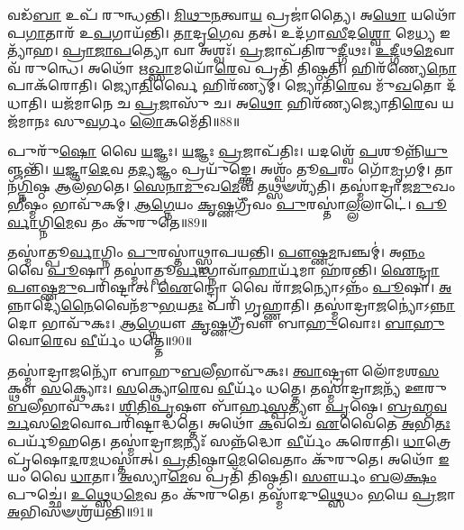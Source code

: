 𑌵𑌡᳴\-\ul{𑌬𑌾} 𑌉𑌪᳴ 𑌰𑍁𑌨𑍍𑌧𑌨𑍍𑌤𑌿।
\-\ul{𑌮𑌿}\-\-\ul{𑌥𑍁}\-\-\ul{𑌨}\-𑌤𑍍𑌵𑌾\-\ul{𑌯} 𑌪𑍍𑌰𑌜𑌾॑𑌤𑍍𑌯𑍈।
𑌅\-\ul{𑌥𑍋} 𑌯𑌥𑍋᳴𑌪\-\ul{𑌗𑌾}\-𑌤𑌾𑌰᳴ 𑌉\-\ul{𑌪}\-𑌗𑌾𑌯᳴𑌨𑍍𑌤𑌿।
\-\ul{𑌤𑌾}\-𑌦𑍃\-\ul{𑌗𑍇}\-𑌵 𑌤𑌤𑍍।
𑌉𑌦᳴𑌗𑌾\-\ul{𑌸𑍀}\-𑌦\-\ul{𑌶𑍍𑌵𑍋} 𑌮𑍇\-\ul{𑌧𑍍𑌯} 𑌇𑌤𑍍𑌯𑌾᳴𑌹।
\-\ul{𑌪𑍍𑌰𑌾}\-\-\ul{𑌜𑌾}\-\-\ul{𑌪}\-𑌤𑍍𑌯𑍋 𑌵𑌾 𑌅𑌶𑍍𑌵𑌃᳴।
\-\ul{𑌪𑍍𑌰}\-𑌜𑌾𑌪᳴𑌤𑌿𑌰𑍁\-\ul{𑌦𑍍𑌗𑍀}\-𑌥𑌃।
\-\ul{𑌉}\-\-\ul{𑌦𑍍𑌗𑍀}\-𑌥\-\ul{𑌮𑍇}\-𑌵𑌾𑌵᳴ 𑌰𑍁𑌨𑍍𑌧𑍇।
𑌅𑌥𑍋᳴ 𑌋\-\ul{𑌖𑍍𑌸𑌾}\-𑌮𑌯𑍋᳴\-\ul{𑌰𑍇}\-𑌵 𑌪𑍍𑌰𑌤𑌿᳴ 𑌤𑌿𑌷𑍍𑌠𑌤𑌿।
𑌹𑌿𑌰᳴𑌣𑍍𑌯𑍇\-\ul{𑌨𑍋}\-𑌪𑌾𑌕᳴𑌰𑍋𑌤𑌿।
𑌜𑍍𑌯𑍋\-\ul{𑌤𑌿}\-𑌰𑍍𑌵𑍈 𑌹𑌿𑌰᳴𑌣𑍍𑌯𑌮𑍍।
𑌜𑍍𑌯𑍋𑌤𑌿᳴\-\ul{𑌰𑍇}\-𑌵 𑌮𑍁᳴\-\ul{𑌖}\-𑌤𑍋 𑌦᳴𑌧𑌾𑌤𑌿।
𑌯𑌜᳴𑌮𑌾𑌨𑍇 𑌚 \ul{𑌪𑍍𑌰}\-𑌜𑌾𑌸𑍁᳴ 𑌚।
𑌅\-\ul{𑌥𑍋} 𑌹𑌿𑌰᳴𑌣𑍍𑌯𑌜𑍍𑌯𑍋𑌤𑌿\-\ul{𑌰𑍇}\-𑌵 𑌯𑌜᳴𑌮𑌾𑌨𑌃 𑌸𑍁\-\ul{𑌵}\-𑌰𑍍𑌗𑌂 \ul{𑌲𑍋}\-𑌕𑌮𑍇᳴𑌤𑌿॥88॥\anuvakamend[𑌤𑌥𑍍𑌸 \ul{𑌉}\-𑌪𑌾𑌕᳴𑌰𑍋𑌤𑌿 \ul{𑌚}\-𑌤𑍍𑌵𑌾𑌰𑌿᳴ 𑌚]

𑌪𑍁𑌰𑍁᳴\-\ul{𑌷𑍋} 𑌵𑍈 \ul{𑌯}\-𑌜𑍍𑌞𑌃।
\-\ul{𑌯}\-𑌜𑍍𑌞𑌃 \ul{𑌪𑍍𑌰}\-𑌜𑌾\-𑌪᳴𑌤𑌿𑌃।
𑌯𑌦𑌶𑍍𑌵𑍇᳴ \ul{𑌪}\-𑌶𑍂𑌨𑍍𑌨𑌿᳴\-\ul{𑌯𑍁}\-𑌞𑍍𑌜𑌨𑍍𑌤𑌿᳴।
\-\ul{𑌯}\-𑌜𑍍𑌞𑌾\-\ul{𑌦𑍇}\-𑌵 𑌤\-\ul{𑌦𑍍𑌯}\-𑌜𑍍𑌞𑌂 𑌪𑍍𑌰𑌯𑍁᳴𑌙𑍍𑌕𑍍𑌤𑍇।
𑌅𑌶𑍍𑌵𑌂᳴ 𑌤𑍂\-\ul{𑌪}\-𑌰𑌂 𑌗𑍋᳴\-\ul{𑌮𑍃}\-𑌗𑌮𑍍।
𑌤𑌾𑌨᳴\-\ul{𑌗𑍍𑌨𑌿}\-𑌷𑍍𑌠 𑌆𑌲᳴𑌭𑌤𑍇।
\-\ul{𑌸𑍇}\-\-\ul{𑌨𑌾}\-\-\ul{𑌮𑍁}\-𑌖\-\ul{𑌮𑍇}\-𑌵 𑌤𑌥𑍍𑌸𑍟𑌶𑍍𑌯᳴𑌤𑌿।
𑌤𑌸𑍍𑌮𑌾॑𑌦𑍍𑌰𑌾𑌜\-\ul{𑌮𑍁}\-𑌖𑌂 \ul{𑌭𑍀}\-𑌷𑍍𑌮𑌂 𑌭𑌾𑌵𑍁᳴𑌕𑌮𑍍।
\-\ul{𑌆}\-\-\ul{𑌗𑍍𑌨𑍇}\-𑌯𑌂 \ul{𑌕𑍃}\-𑌷𑍍𑌣𑌗𑍍𑌰𑍀᳴𑌵𑌂 \ul{𑌪𑍁}\-𑌰𑌸𑍍𑌤𑌾॑\-\ul{𑌲𑍍𑌲}\-𑌲𑌾𑌟𑍇॑।
\-\ul{𑌪𑍂}\-\-\ul{𑌰𑍍𑌵𑌾}\-𑌗𑍍𑌨𑌿\-\ul{𑌮𑍇}\-𑌵 𑌤𑌂 𑌕𑍁᳴𑌰𑍁𑌤𑍇॥89॥

𑌤𑌸𑍍𑌮𑌾॑𑌤𑍍𑌪𑍂\-\ul{𑌰𑍍𑌵𑌾}\-𑌗𑍍𑌨𑌿𑌂 \ul{𑌪𑍁}\-𑌰𑌸𑍍𑌤𑌾॑𑌥𑍍𑌸𑍍𑌥𑌾𑌪𑌯𑌨𑍍𑌤𑌿।
\-\ul{𑌪𑍗}\-𑌷𑍍𑌣\-\ul{𑌮}\-𑌨𑍍𑌵𑌞𑍍𑌚𑌮𑍍॑।
𑌅\-\ul{𑌨𑍍𑌨𑌂} 𑌵𑍈 \ul{𑌪𑍂}\-𑌷𑌾।
𑌤𑌸𑍍𑌮𑌾॑𑌤𑍍𑌪𑍂\-\ul{𑌰𑍍𑌵𑌾}\-𑌗𑍍𑌨𑌾𑌵𑌾᳴\-\ul{𑌹𑌾}\-𑌰𑍍𑌯᳴𑌮𑌾 𑌹᳴𑌰𑌨𑍍𑌤𑌿।
\-\ul{𑌐}\-\-\ul{𑌨𑍍𑌦𑍍𑌰𑌾}\-\-\ul{𑌪𑍗}\-𑌷𑍍𑌣\-\ul{𑌮𑍁}\-𑌪𑌰𑌿᳴𑌷𑍍𑌟𑌾𑌤𑍍।
\-\ul{𑌐}\-𑌨𑍍𑌦𑍍𑌰𑍋 𑌵𑍈 𑌰𑌾᳴\-\ul{𑌜}\-𑌨𑍍𑌯𑍋\-𑌽𑌨𑍍𑌨𑌂᳴ \ul{𑌪𑍂}\-𑌷𑌾।
\-\ul{𑌅}\-𑌨𑍍𑌨𑌾𑌦𑍍𑌯𑍇᳴\-\ul{𑌨𑍈}\-𑌵𑍈𑌨᳴𑌮𑍁\-\ul{𑌭}\-𑌯\-\ul{𑌤𑌃} 𑌪𑌰𑌿᳴ 𑌗𑍃𑌹𑍍𑌣𑌾𑌤𑌿।
𑌤𑌸𑍍𑌮𑌾॑𑌦𑍍𑌰𑌾\-\ul{𑌜}\-𑌨𑍍𑌯𑍋॑\-𑌽\-\ul{𑌨𑍍𑌨𑌾}\-𑌦𑍋 𑌭𑌾𑌵𑍁᳴𑌕𑌃।
\-\ul{𑌆}\-\-\ul{𑌗𑍍𑌨𑍇}\-𑌯𑍗 \ul{𑌕𑍃}\-𑌷𑍍𑌣𑌗𑍍𑌰𑍀᳴𑌵𑍗 𑌬𑌾\-\ul{𑌹𑍁}\-𑌵𑍋𑌃।
\-\ul{𑌬𑌾}\-\-\ul{𑌹𑍁}\-𑌵𑍋\-\ul{𑌰𑍇}\-𑌵 \ul{𑌵𑍀}\-𑌰𑍍𑌯𑌂᳴ 𑌧𑌤𑍍𑌤𑍇॥90॥

𑌤𑌸𑍍𑌮𑌾॑𑌦𑍍𑌰𑌾\-\ul{𑌜}\-𑌨𑍍𑌯𑍋᳴ 𑌬𑌾𑌹𑍁\-\ul{𑌬}\-𑌲𑍀𑌭𑌾𑌵𑍁᳴𑌕𑌃।
\-\ul{𑌤𑍍𑌵𑌾}\-𑌷𑍍𑌟𑍍𑌰𑍗 𑌲𑍋᳴𑌮𑌶\-\ul{𑌸}\-𑌕𑍍𑌥𑍗 \ul{𑌸}\-𑌕𑍍𑌥𑍍𑌯𑍋𑌃।
\-\ul{𑌸}\-𑌕𑍍𑌥𑍍𑌯𑍋\-\ul{𑌰𑍇}\-𑌵 \ul{𑌵𑍀}\-𑌰𑍍𑌯𑌂᳴ 𑌧𑌤𑍍𑌤𑍇।
𑌤𑌸𑍍𑌮𑌾॑𑌦𑍍𑌰𑌾\-\ul{𑌜}\-𑌨𑍍𑌯᳴ 𑌊𑌰𑍁\-\ul{𑌬}\-𑌲𑍀𑌭𑌾𑌵𑍁᳴𑌕𑌃।
\-\ul{𑌶𑌿}\-\-\ul{𑌤𑌿}\-\-\ul{𑌪𑍃}\-𑌷𑍍𑌠𑍗 𑌬𑌾᳴𑌰𑍍\mbox{}𑌹\-\ul{𑌸𑍍𑌪}\-𑌤𑍍𑌯𑍗 \ul{𑌪𑍃}\-𑌷𑍍𑌠𑍇।
\-\ul{𑌬𑍍𑌰}\-\-\ul{𑌹𑍍𑌮}\-\-\ul{𑌵}\-\-\ul{𑌰𑍍𑌚}\-𑌸\-\ul{𑌮𑍇}\-𑌵𑍋𑌪𑌰𑌿᳴𑌷𑍍𑌟𑌾𑌦𑍍𑌧𑌤𑍍𑌤𑍇।
𑌅𑌥𑍋᳴ \ul{𑌕}\-𑌵𑌚𑍇᳴ \ul{𑌏}\-𑌵𑍈𑌤𑍇 \ul{𑌅}\-𑌭𑌿\-\ul{𑌤𑌃} 𑌪𑌰𑍍𑌯𑍂᳴𑌹𑌤𑍇।
𑌤𑌸𑍍𑌮𑌾॑𑌦𑍍𑌰𑌾\-\ul{𑌜}\-𑌨𑍍𑌯𑌃᳴ 𑌸𑌨𑍍𑌨᳴𑌦𑍍𑌧𑍋 \ul{𑌵𑍀}\-𑌰𑍍𑌯𑌂᳴ 𑌕𑌰𑍋𑌤𑌿।
\-\ul{𑌧𑌾}\-𑌤𑍍𑌰𑍇 𑌪𑍃᳴𑌷𑍋\-\ul{𑌦}\-𑌰\-\ul{𑌮}\-𑌧𑌸𑍍𑌤𑌾॑𑌤𑍍।
\-\ul{𑌪𑍍𑌰}\-\-\ul{𑌤𑌿}\-𑌷𑍍𑌠𑌾\-\ul{𑌮𑍇}\-𑌵𑍈𑌤𑌾𑌂 𑌕𑍁᳴𑌰𑍁𑌤𑍇।
𑌅𑌥𑍋᳴ \ul{𑌇}\-𑌯𑌂 𑌵𑍈 \ul{𑌧𑌾}\-𑌤𑌾।
\-\ul{𑌅}\-𑌸𑍍𑌯𑌾\-\ul{𑌮𑍇}\-𑌵 𑌪𑍍𑌰𑌤𑌿᳴ 𑌤𑌿𑌷𑍍𑌠𑌤𑌿।
\-\ul{𑌸𑍗}\-𑌰𑍍𑌯𑌂 \ul{𑌬}\-𑌲\-\ul{𑌕𑍍𑌷𑌂} 𑌪𑍁𑌚𑍍𑌛𑍇॑।
\-\ul{𑌉}\-\-\ul{𑌥𑍍𑌸𑍇}\-𑌧\-\ul{𑌮𑍇}\-𑌵 𑌤𑌂 𑌕𑍁᳴𑌰𑍁𑌤𑍇।
𑌤𑌸𑍍𑌮𑌾᳴𑌦𑍁\-\ul{𑌥𑍍𑌸𑍇}\-𑌧𑌂 \ul{𑌭}\-𑌯𑍇 \ul{𑌪𑍍𑌰}\-𑌜𑌾 \ul{𑌅}\-𑌭𑌿𑌸𑍟𑌶𑍍𑌰᳴𑌯𑌨𑍍𑌤𑌿॥91॥\anuvakamend[\-\ul{𑌕𑍁}\-\-\ul{𑌰𑍁}\-\-\ul{𑌤𑍇} \ul{𑌧}\-\-\ul{𑌤𑍍𑌤𑍇} \ul{𑌕𑍁}\-\-\ul{𑌰𑍁}\-\-\ul{𑌤𑍇} 𑌪𑌞𑍍𑌚᳴ 𑌚]




